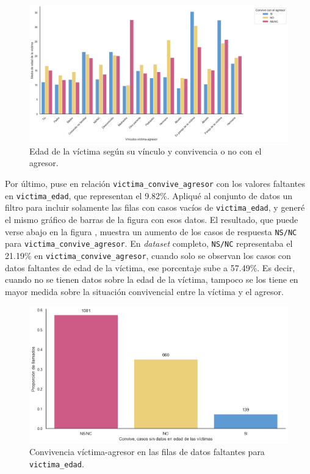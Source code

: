 \documentclass[10 pt]{article}
\begin{document}
\begin{figure}[H]
    \begin{center}
    \includegraphics[scale=.4]{images/convive_edad_agresor.png}
    \caption{Edad de la víctima según su vínculo y convivencia o no con el agresor.}
    \label{edadconvagr}
    \end{center}
    \end{figure}


Por último, puse en relación \texttt{victima\_convive\_agresor} con los valores faltantes en \texttt{victima\_edad}, que representan el 9.82\%. Apliqué al conjunto de datos un filtro para incluir solamente las filas con casos vacíos de \texttt{victima\_edad}, y generé el mismo gráfico de barras de la figura  con esos datos. El resultado, que puede verse abajo en la figura , muestra un aumento de los casos de respuesta \texttt{NS/NC} para \texttt{victima\_convive\_agresor}. En \textit{dataset} completo, \texttt{NS/NC} representaba el 21.19\% en \texttt{victima\_convive\_agresor}, cuando solo se observan los casos con datos faltantes de edad de la víctima, ese porcentaje sube a 57.49\%. Es decir, cuando no se tienen datos sobre la edad de la víctima, tampoco se los tiene en mayor medida sobre la situación convivencial entre la víctima y el agresor.

\begin{figure}[H]
    \begin{center}
    \includegraphics[scale=.4]{images/latex_convive_sd_edad_vic.png}
    \caption{Convivencia víctima-agresor en las filas de datos faltantes para \texttt{victima\_edad}.}
    \label{conviveedadfaltantevic}
    \end{center}
    \end{figure}
  
\end{document}
